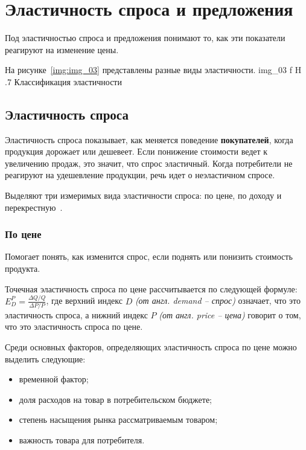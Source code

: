 \chapter{Эластичность спроса и предложения}

Под эластичностью спроса и предложения понимают то, как эти показатели реагируют на изменение цены. 

На рисунке~\ref{img:img_03} представлены разные виды эластичности.
{img_03}
{f}
{H}
{.7\textwidth}
{Классификация эластичности~\cite{elast1}}

\section{Эластичность спроса}

Эластичность спроса показывает, как меняется поведение \textbf{покупателей}, когда продукция дорожает или дешевеет. 
Если понижение стоимости ведет к увеличению продаж, это значит, что спрос эластичный.
Когда потребители не реагируют на удешевление продукции, речь идет о неэластичном спросе.

Выделяют три измеримых вида эластичности спроса: по цене, по доходу и перекрестную~\cite{elast2}.

\subsection{По цене}
Помогает понять, как изменится спрос, если поднять или понизить стоимость продукта. 

Точечная эластичность спроса по цене рассчитывается по следующей формуле: $E_{D}^{P}=\frac{\Delta Q/Q}{\Delta P/P}$,
где верхний индекс $D$ \textit{(от англ. demand -- спрос)} означает, что это эластичность спроса, а нижний индекс $P$ \textit{(от англ. price -- цена)} говорит о том, что это эластичность спроса по цене.

Среди основных факторов, определяющих эластичность спроса по цене можно выделить следующие: 
\begin{itemize}
	\item временной фактор;
	\item доля расходов на товар в потребительском бюджете;
	\item степень насыщения рынка рассматриваемым товаром;
	\item важность товара для потребителя.
\end{itemize}

